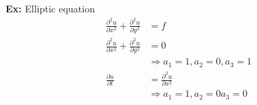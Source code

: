 \documentclass[10pt]{article}
\newcommand{\1}{\mathbb{1}}
\renewcommand{\part}{\partial}
\begin{document}
\textbf{Ex:} Elliptic equation
\begin{align*}
    \frac{\part^2 u}{\part x^2} + \frac{\part^2 u}{\part y^2} &= f  \tag*{poisson equation}\\
    \frac{\part^2 u}{\part x^2} + \frac{\part^2 u}{\part y^2} &= 0  \tag*{laplace equation}\\
                                                              &\Rightarrow a_1 = 1, a_2 = 0, a_3 = 1\\
    \frac{\part u}{\part t} &= \frac{\part^2 u}{\part x^2} \tag*{heat equation}\\
                          &\Rightarrow  a_1 = 1, a_2 = 0 a_3 = 0\\
\end{align*}
\end{document}
